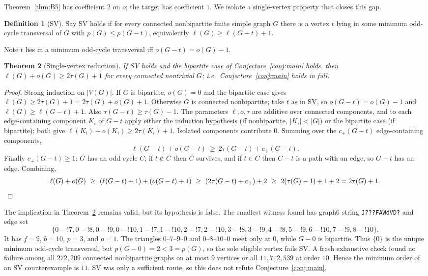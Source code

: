 \documentclass[11pt]{article}
\theoremstyle{plain}
\newtheorem{theorem}{Theorem}[section]
\theoremstyle{definition}
\newtheorem{definition}[theorem]{Definition}
\newcommand{\FVS}{\tau}
\newcommand{\OCT}{o}
\newcommand{\lf}{\ell}
\begin{document}
Theorem~\ref{thm:B5} has coefficient $2$ on $\OCT$; the target has coefficient
$1$. We isolate a single-vertex property that closes this gap.

\begin{definition}[SV]\label{def:SV}
Say SV holds if for every connected nonbipartite finite simple graph $G$ there is
a vertex $t$ lying in some minimum odd-cycle transversal of $G$ with
$p(G)\le p(G-t)$, equivalently $\lf(G)\ge\lf(G-t)+1$.
\end{definition}

Note $t$ lies in a minimum odd-cycle transversal iff $\OCT(G-t)=\OCT(G)-1$.

\begin{theorem}[Single-vertex reduction]\label{thm:SV}
If SV holds and the bipartite case of Conjecture~\ref{conj:main} holds, then
$\lf(G)+\OCT(G)\ge2\FVS(G)+1$ for every connected nontrivial $G$; i.e.\
Conjecture~\ref{conj:main} holds in full.
\end{theorem}

\begin{proof}
Strong induction on $|V(G)|$. If $G$ is bipartite, $\OCT(G)=0$ and the bipartite
case gives $\lf(G)\ge2\FVS(G)+1=2\FVS(G)+\OCT(G)+1$. Otherwise $G$ is connected
nonbipartite; take $t$ as in SV, so $\OCT(G-t)=\OCT(G)-1$ and
$\lf(G)\ge\lf(G-t)+1$. Also $\FVS(G-t)\ge\FVS(G)-1$. The parameters $\lf,\OCT,
\FVS$ are additive over connected components, and to each edge-containing
component $K_i$ of $G-t$ apply either the induction hypothesis (if nonbipartite,
$|K_i|<|G|$) or the bipartite case (if bipartite); both give
$\lf(K_i)+\OCT(K_i)\ge2\FVS(K_i)+1$. Isolated components contribute $0$. Summing
over the $c_+(G-t)$ edge-containing components,
\[
\lf(G-t)+\OCT(G-t)\ \ge\ 2\FVS(G-t)+c_+(G-t).
\]
Finally $c_+(G-t)\ge1$: $G$ has an odd cycle $C$; if $t\notin C$ then $C$
survives, and if $t\in C$ then $C-t$ is a path with an edge, so $G-t$ has an edge.
Combining,
\[
\lf(G)+\OCT(G)\ \ge\ (\lf(G-t)+1)+(\OCT(G-t)+1)
\ \ge\ (2\FVS(G-t)+c_+)+2
\ \ge\ 2(\FVS(G)-1)+1+2 = 2\FVS(G)+1. \qedhere
\]
\end{proof}

The implication in Theorem~\ref{thm:SV} remains valid, but its hypothesis is
false.  The smallest witness found has graph6 string
\texttt{J???FAWdVD?} and edge set
\[
\{0\!-!7,0\!-!8,0\!-!9,0\!-!10,1\!-!7,1\!-!10,
2\!-!7,2\!-!10,3\!-!8,3\!-!9,4\!-!8,5\!-!9,
6\!-!10,7\!-!9,8\!-!10\}.
\]
It has $f=9$, $b=10$, $p=3$, and $\OCT=1$.  The triangles
$0$--$7$--$9$--$0$ and $0$--$8$--$10$--$0$ meet only at $0$, while $G-0$ is
bipartite.  Thus $\{0\}$ is the unique minimum odd-cycle transversal, but
$p(G-0)=2<3=p(G)$, so the sole eligible vertex fails SV.  A fresh exhaustive
check found no failure among all $272,209$ connected nonbipartite graphs on at
most $9$ vertices or all $11,712,539$ at order $10$.  Hence the minimum order
of an SV counterexample is $11$.  SV was only a sufficient route, so this does
not refute Conjecture~\ref{conj:main}.
\end{document}
